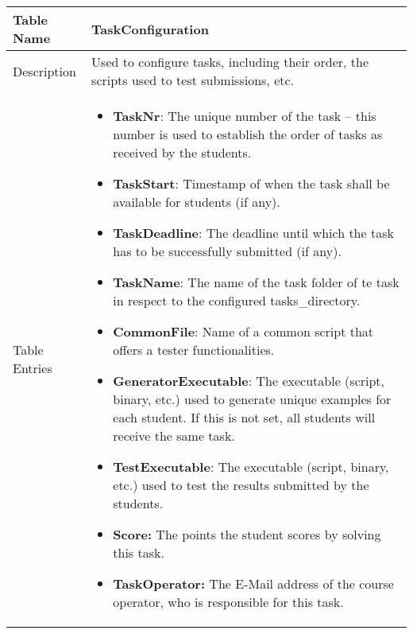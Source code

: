 \begin{tabular}{|p{3cm}|p{10cm}|}
\hline
Table Name & TaskConfiguration \\
\hline
Description & Used to configure tasks, including their order, the scripts used to test
	submissions, etc.\\
\hline
Table Entries & \begin{itemize}
    \item {\bf TaskNr}: The unique number of the task -- this number is used to establish
		the order of tasks as received by the students.
    \item {\bf TaskStart}: Timestamp of when the task shall be available for students
		(if any).
    \item {\bf TaskDeadline}: The deadline until which the task has to be successfully
		submitted (if any).
    \item {\bf TaskName}: The name of the task folder of te task in respect to the
	configured tasks\_directory.
	\item {\bf CommonFile}: Name of a common script that offers a tester functionalities.
    \item {\bf GeneratorExecutable}: The executable (script, binary, etc.) used to
		generate unique examples for each student. If this is not set, all students will
		receive the same task.
    \item {\bf TestExecutable}: The executable (script, binary, etc.) used to test the
		results submitted by the students.
    \item {\bf Score:} The points the student scores by solving this task.
    \item {\bf TaskOperator:} The E-Mail address of the course operator, who is
		responsible for this task.
    \end{itemize}

\\
\hline
\end{tabular}

